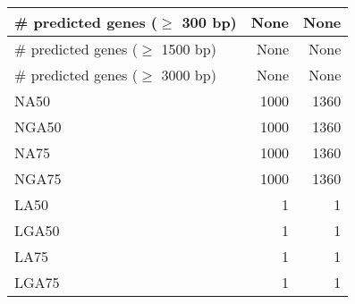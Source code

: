 \begin{table}[ht]
\begin{center}
\begin{tabular}{|l*{2}{|r}|}
\# predicted genes ($\geq$ 300 bp) & None & None \\ \hline
\# predicted genes ($\geq$ 1500 bp) & None & None \\ \hline
\# predicted genes ($\geq$ 3000 bp) & None & None \\ \hline
NA50 & 1000 & 1360 \\ \hline
NGA50 & 1000 & 1360 \\ \hline
NA75 & 1000 & 1360 \\ \hline
NGA75 & 1000 & 1360 \\ \hline
LA50 & 1 & 1 \\ \hline
LGA50 & 1 & 1 \\ \hline
LA75 & 1 & 1 \\ \hline
LGA75 & 1 & 1 \\ \hline
\end{tabular}
\end{center}
\end{table}
